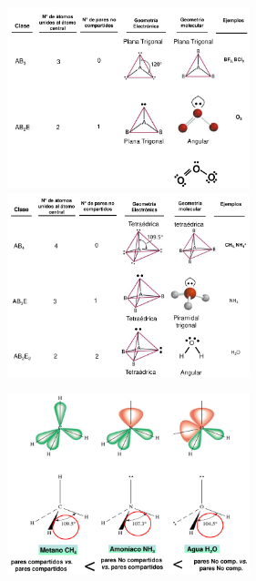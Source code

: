         \saltoPag%
        \begin{center}
            \includegraphics[width=7cm]{./imagenes/geometriaElectronica3.png}
            \includegraphics[width=7cm]{./imagenes/geometriaElectronica4.png}
        \end{center}
        \begin{center} \includegraphics[width=7cm]{./imagenes/ejemplosRepulsionParesElectrones.png} \end{center}
